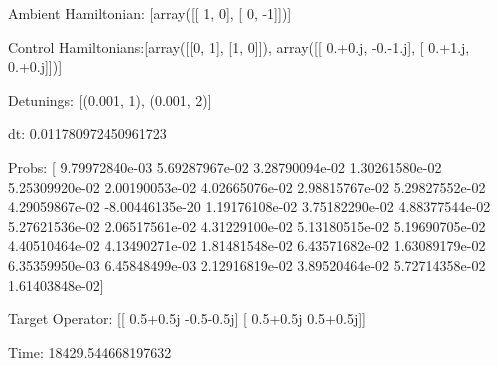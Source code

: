 \documentclass{article}
\begin{document}
    

\newpage

Ambient Hamiltonian: [array([[ 1,  0],
       [ 0, -1]])]

Control Hamiltonians:[array([[0, 1],
       [1, 0]]), array([[ 0.+0.j, -0.-1.j],
       [ 0.+1.j,  0.+0.j]])]

Detunings: [(0.001, 1), (0.001, 2)]

 dt: 0.011780972450961723

Probs: [  9.79972840e-03   5.69287967e-02   3.28790094e-02   1.30261580e-02
   5.25309920e-02   2.00190053e-02   4.02665076e-02   2.98815767e-02
   5.29827552e-02   4.29059867e-02  -8.00446135e-20   1.19176108e-02
   3.75182290e-02   4.88377544e-02   5.27621536e-02   2.06517561e-02
   4.31229100e-02   5.13180515e-02   5.19690705e-02   4.40510464e-02
   4.13490271e-02   1.81481548e-02   6.43571682e-02   1.63089179e-02
   6.35359950e-03   6.45848499e-03   2.12916819e-02   3.89520464e-02
   5.72714358e-02   1.61403848e-02]

Target Operator: [[ 0.5+0.5j -0.5-0.5j]
 [ 0.5+0.5j  0.5+0.5j]]

Time: 18429.544668197632
\end{document}
